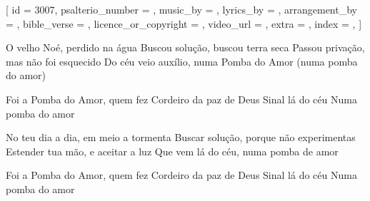 [
    id                     = {3007},
    psalterio_number       = {},
    music_by               = {},
    lyrics_by              = {},
    arrangement_by         = {},
    bible_verse            = {},
    licence_or_copyright   = {},
    video_url              = {},
    extra                  = {},
    index                  = {},
]


\beginverse

O velho Noé, perdido na água
Buscou solução, buscou terra seca
Passou privação, mas não foi esquecido
Do céu veio auxílio, numa Pomba do Amor (numa pomba do amor)

\endverse


\beginchorus

Foi a Pomba do Amor, quem fez
Cordeiro da paz de Deus
Sinal lá do céu
Numa pomba do amor

\endchorus


\beginverse

No teu dia a dia, em meio a tormenta
Buscar solução, porque não experimentas
Estender tua mão, e aceitar a luz
Que vem lá do céu, numa pomba de amor

\endverse


\beginchorus

Foi a Pomba do Amor, quem fez
Cordeiro da paz de Deus
Sinal lá do céu
Numa pomba do amor

\endchorus

\endsong
